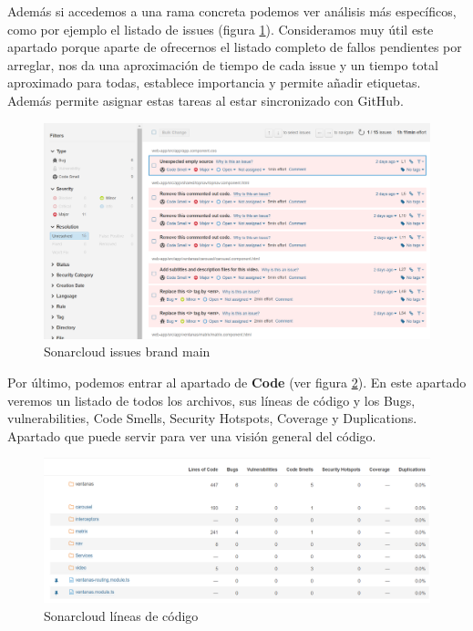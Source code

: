 Además si accedemos a una rama concreta podemos ver análisis más específicos, como por ejemplo el listado de issues (figura \ref{fig:sonarcloud_issues}). Consideramos muy útil este apartado porque aparte de ofrecernos el listado completo de fallos pendientes por arreglar, nos da una aproximación de tiempo de cada issue y un tiempo total aproximado para todas, establece importancia y permite añadir etiquetas. Además permite asignar estas tareas al estar sincronizado con GitHub.

\begin{figure}[h!] 
\centering
    \includegraphics[width=1\textwidth]{img/sonarcloud_issues_1.PNG}
\caption{Sonarcloud issues brand main}
\label{fig:sonarcloud_issues}
\end{figure}

\newpage
Por último, podemos entrar al apartado de \textbf{Code} (ver figura \ref{fig:sonarcloud_lines_code}). En este apartado veremos un listado de todos los archivos, sus líneas de código y los Bugs, vulnerabilities, Code Smells, Security Hotspots, Coverage y Duplications. Apartado que puede servir para ver una visión general del código. 

\begin{figure}[h!] 
\centering
    \includegraphics[width=1\textwidth]{img/sonarcloud_lines_code_1.PNG}
\caption{Sonarcloud líneas de código}
\label{fig:sonarcloud_lines_code}
\end{figure}


